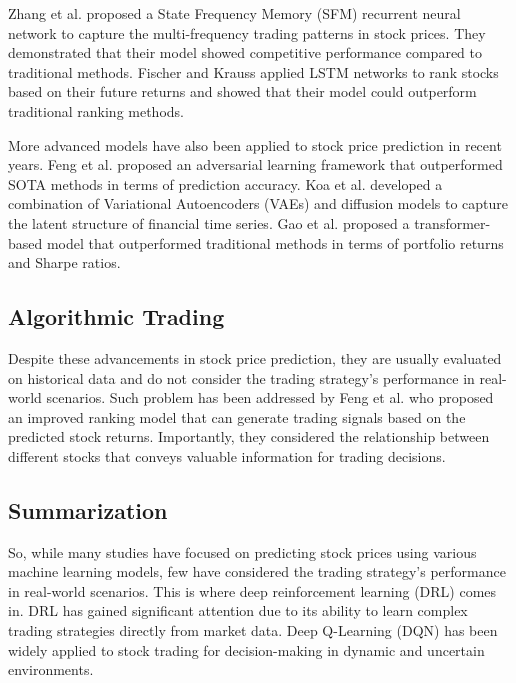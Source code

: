 \documentclass[conference]{IEEEtran}
\begin{document}
Zhang et al. \cite{zhang2017} proposed a State Frequency Memory (SFM)
recurrent neural network to capture the multi-frequency trading
patterns in stock prices. They demonstrated that their model showed
competitive performance compared to traditional methods. Fischer and
Krauss \cite{fischer2018} applied LSTM networks to rank stocks based
on their future returns and showed that their model could outperform
traditional ranking methods.

More advanced models have also been applied to stock price prediction
in recent years. Feng et al. \cite{feng2019an} proposed an
adversarial learning framework that outperformed SOTA methods in
terms of prediction accuracy. Koa et al. \cite{koa2023} developed a
combination of Variational Autoencoders (VAEs) and diffusion models
to capture the latent structure of financial time series. Gao et al.
\cite{gao2023} proposed a transformer-based model that outperformed
traditional methods in terms of portfolio returns and Sharpe ratios.

\subsection{Algorithmic Trading}

Despite these advancements in stock price prediction, they are
usually evaluated on historical data and do not consider the trading
strategy's performance in real-world scenarios. Such problem has been
addressed by Feng et al. \cite{feng2019rank} who proposed an improved
ranking model that can generate trading signals based on the
predicted stock returns. Importantly, they considered the
relationship between different stocks that conveys valuable
information for trading decisions.


\subsection{Summarization}

So, while many studies have focused on predicting stock prices using various machine learning models, few have considered the trading strategy's performance in real-world scenarios. This is where deep reinforcement learning (DRL) comes in. DRL has gained significant attention due to its ability to learn complex trading strategies directly from market data. Deep Q-Learning (DQN) has been widely applied to stock trading for decision-making in dynamic and uncertain environments. 
\end{document}
